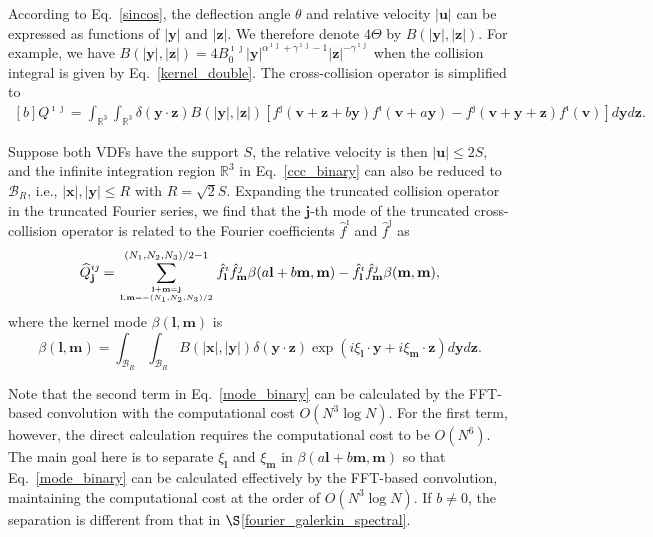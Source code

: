 According to Eq.~\eqref{sincos}, the deflection angle $\theta$ and relative velocity $|\textbf{u}|$ can be expressed as functions of $|\textbf{y}|$ and $|\textbf{z}|$. We therefore denote $4\Theta$ by $B(|\textbf{y}|,|\textbf{z}|)$. For example, we have  $B(|\textbf{y}|,|\textbf{z}|)=4B_0^{\imath\jmath}|\textbf{y}|^{\alpha^{\imath\jmath}+\gamma^{\imath\jmath}-1}  |\textbf{z}|^{-\gamma^{\imath\jmath}}$ when the collision integral is given by Eq.~\eqref{kernel_double}. The cross-collision operator is simplified to
\begin{equation}\label{ccc_binary}
\begin{aligned}[b]
 Q^{\imath\jmath}=\int_{\mathbb{R}^3}\int_{\mathbb{R}^3}\delta(\textbf{y}\cdot{}\textbf{z})B(|\textbf{y}|,|\textbf{z}|) 
[f^\jmath(\textbf{v}+\textbf{z}+b\textbf{y})f^\imath(\textbf{v}+a\textbf{y})
  -f^\jmath(\textbf{v}+\textbf{y}+\textbf{z})f^\imath(\textbf{v})]d\textbf{y} d\textbf{z}.
\end{aligned}
\end{equation}

Suppose both VDFs have the support $S$, the relative velocity is then $|\textbf{u}|\le2S$, and the infinite integration region $\mathbb{R}^3$ in Eq.~\eqref{ccc_binary} can also be reduced to $\mathcal{B}_R$, i.e., $|\textbf{x}|,|\textbf{y}|\le{R}$ with $R=\sqrt{2}S$. Expanding the truncated collision operator in the truncated Fourier series, we find that the $\textbf{j}$-th mode of the truncated cross-collision operator is related to the Fourier coefficients $\hat{f}^\imath$ and $\hat{f}^\jmath$ as
\begin{equation}\label{mode_binary}
   \widehat{Q}_\textbf{j}^{\imath\jmath}= \sum_{\textbf{l}+\textbf{m}=\textbf{j} \atop
    \textbf{l},\textbf{m}=-(N_1,N_2,N_3)/2}^{{(N_1,N_2,N_3)}/2-1}
    \hat{f}^\imath_\textbf{l}\hat{f}^\jmath_\textbf{m}\beta(a\textbf{l}+b\textbf{m},\textbf{m})
   -\hat{f}^\imath_\textbf{l}\hat{f}^\jmath_\textbf{m}\beta(\textbf{m},\textbf{m}),
\end{equation}
where the kernel mode $\beta(\textbf{l},\textbf{m})$ is
\begin{equation}\label{kernel_mode0_binary}
\beta(\textbf{l},\textbf{m})=\int_{\mathcal{B}_R}\int_{\mathcal{B}_R}{}B(|\textbf{x}|,|\textbf{y}|)
\delta(\textbf{y}\cdot{\textbf{z}})
\exp(i\xi_\textbf{l}\cdot{\textbf{y}}+i\xi_\textbf{m}\cdot{\textbf{z}})d\textbf{y}d\textbf{z}.
\end{equation}


Note that the second term in Eq.~\eqref{mode_binary} can be calculated by the FFT-based convolution with the computational cost $O(N^3\log{N})$. For the first term, however, the direct calculation requires the computational cost to be $O(N^6)$. The main goal here is to separate $\xi_\textbf{l}$ and $\xi_\textbf{m}$ in $\beta(a\textbf{l}+b\textbf{m},\textbf{m})$ so that Eq.~\eqref{mode_binary} can be calculated effectively by the FFT-based convolution, maintaining the computational cost at the order of $O(N^3\log{N})$. If $b\neq0$, the separation is different from that in $\S$\ref{fourier_galerkin_spectral}.

